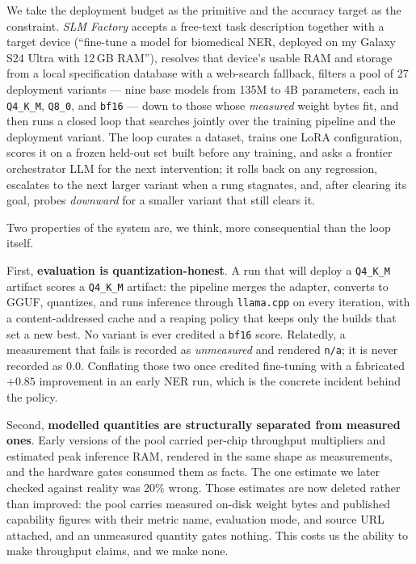 \documentclass[sigconf,10pt]{acmart}
\begin{document}
We take the deployment budget as the primitive and the accuracy target as the constraint.
\emph{SLM Factory} accepts a free-text task description together with a target device
(``fine-tune a model for biomedical NER, deployed on my Galaxy S24 Ultra with 12\,GB RAM''),
resolves that device's usable RAM and storage from a local specification database with a
web-search fallback, filters a pool of 27 deployment variants --- nine base models from
135M to 4B parameters, each in \texttt{Q4\_K\_M}, \texttt{Q8\_0}, and \texttt{bf16} --- down
to those whose \emph{measured} weight bytes fit, and then runs a closed loop that searches
jointly over the training pipeline and the deployment variant. The loop curates a dataset,
trains one LoRA configuration, scores it on a frozen held-out set built before any training,
and asks a frontier orchestrator LLM for the next intervention; it rolls back on any
regression, escalates to the next larger variant when a rung stagnates, and, after clearing
its goal, probes \emph{downward} for a smaller variant that still clears it.

Two properties of the system are, we think, more consequential than the loop itself.

First, \textbf{evaluation is quantization-honest}. A run that will deploy a \texttt{Q4\_K\_M}
artifact scores a \texttt{Q4\_K\_M} artifact: the pipeline merges the adapter, converts to
GGUF, quantizes, and runs inference through \texttt{llama.cpp} on every iteration, with a
content-addressed cache and a reaping policy that keeps only the builds that set a new best.
No variant is ever credited a \texttt{bf16} score. Relatedly, a measurement that fails is
recorded as \emph{unmeasured} and rendered \texttt{n/a}; it is never recorded as $0.0$.
Conflating those two once credited fine-tuning with a fabricated $+0.85$ improvement in an
early NER run, which is the concrete incident behind the policy.

Second, \textbf{modelled quantities are structurally separated from measured ones}. Early
versions of the pool carried per-chip throughput multipliers and estimated peak inference
RAM, rendered in the same shape as measurements, and the hardware gates consumed them as
facts. The one estimate we later checked against reality was 20\% wrong. Those estimates are
now deleted rather than improved: the pool carries measured on-disk weight bytes and
published capability figures with their metric name, evaluation mode, and source URL
attached, and an unmeasured quantity gates nothing. This costs us the ability to make
throughput claims, and we make none.
\end{document}
